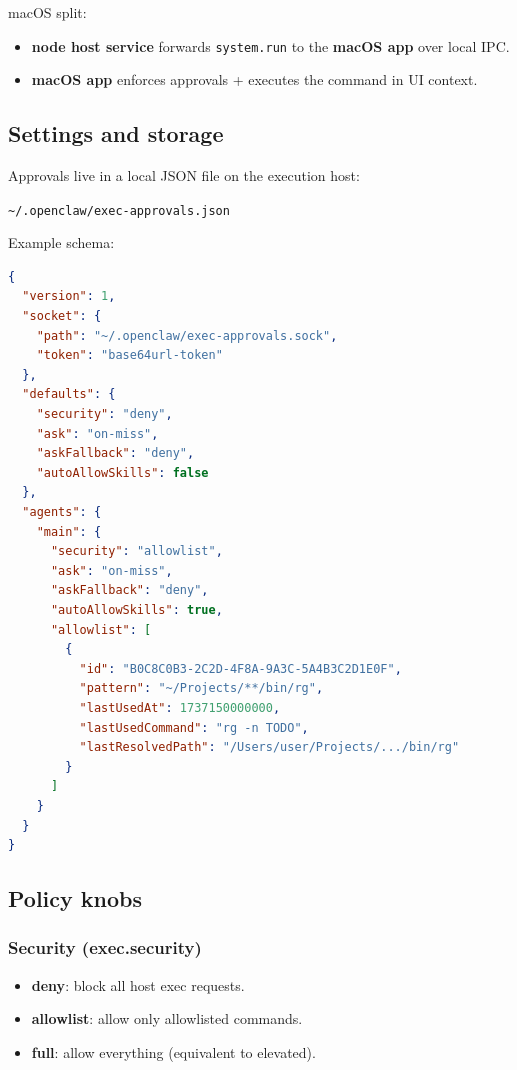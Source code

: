 macOS split:

\begin{itemize}
  \item \textbf{node host service} forwards \texttt{system.run} to the \textbf{macOS app} over local IPC.
  \item \textbf{macOS app} enforces approvals + executes the command in UI context.
\end{itemize}


\subsection{Settings and storage}


Approvals live in a local JSON file on the execution host:

\texttt{\textasciitilde{}/.openclaw/exec-approvals.json}

Example schema:

\begin{lstlisting}[language=json]
{
  "version": 1,
  "socket": {
    "path": "~/.openclaw/exec-approvals.sock",
    "token": "base64url-token"
  },
  "defaults": {
    "security": "deny",
    "ask": "on-miss",
    "askFallback": "deny",
    "autoAllowSkills": false
  },
  "agents": {
    "main": {
      "security": "allowlist",
      "ask": "on-miss",
      "askFallback": "deny",
      "autoAllowSkills": true,
      "allowlist": [
        {
          "id": "B0C8C0B3-2C2D-4F8A-9A3C-5A4B3C2D1E0F",
          "pattern": "~/Projects/**/bin/rg",
          "lastUsedAt": 1737150000000,
          "lastUsedCommand": "rg -n TODO",
          "lastResolvedPath": "/Users/user/Projects/.../bin/rg"
        }
      ]
    }
  }
}
\end{lstlisting}


\subsection{Policy knobs}


\subsubsection{Security (exec.security)}


\begin{itemize}
  \item \textbf{deny}: block all host exec requests.
  \item \textbf{allowlist}: allow only allowlisted commands.
  \item \textbf{full}: allow everything (equivalent to elevated).
\end{itemize}


